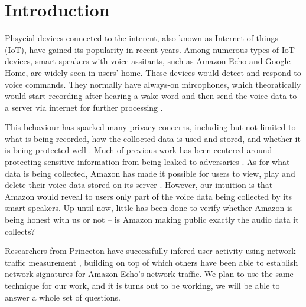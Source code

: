 \section{Introduction}
Phsycial devices connected to the interent, also known as Internet-of-things (IoT), have gained its popularity in recent years. Among numerous types of IoT devices, smart speakers with voice assitants, such as Amazon Echo and Google Home, are widely seen in users' home. These devices would detect and respond to voice commands. They normally have always-on mircophones, which theoratically would start recording after hearing a wake word and then send the voice data to a server via internet for further processing \cite{AmazonEc68:online}.

This behaviour has sparked many privacy concerns, including but not limited to what is being recorded, how the collocted data is used and stored, and whether it is being protected well \cite{lau2018alexa, fowler_2019, apthorpe2017smart, apthorpe2019keeping, apthorpe2017spying}. Much of previous work has been centered around protecting sensitive information from being leaked to adversaries \cite{apthorpe2017smart, apthorpe2019keeping, apthorpe2017spying}. As for what data is being collected, Amazon has made it possible for users to view, play and delete their voice data stored on its server \cite{ford2019alexa}. However, our intuition is that Amazon would reveal to users only part of the voice data being collected by its smart speakers. Up until now, little has been done to verify whether Amazon is being honest with us or not -- is Amazon making public exactly the audio data it collects?

Researchers from Princeton have successfully infered user activity using network traffic measurement \cite{apthorpe2017spying}, building on top of which others have been able to establish network signatures for Amazon Echo's network traffic. We plan to use the same technique for our work, and it is turns out to be working, we will be able to answer a whole set of questions.
